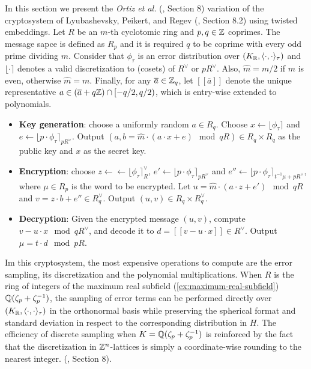 \documentclass[Ingles]{ic-tese-v3}
\begin{document}
\begin{text}
  In this section we present the \textit{Ortiz et al.} (\cite{Ortiz2021}, Section 8)
  variation of the cryptosystem of Lyubashevsky, Peikert, and Regev
  (\cite{LPV2013}, Section 8.2) using twisted embeddings. Let $R$ be an $m$-th
  cyclotomic ring and $p, q \in \mathbb{Z}$ coprimes. The message sapce is defined as
  $R_p$ and it is required $q$ to be coprime with every odd prime dividing
  $m$. Consider that $\phi_\tau$ is an error distribution over $(K_{\mathbb{R}},\langle{\cdot,\cdot}\rangle_\tau)$
  and $\lfloor{\cdot}\rceil$ denotes a valid discretization to (cosets) of $R^\vee$ or $pR^\vee$.
  Also, $\hat{m} = m/2$ if $m$ is even, otherwise $\hat{m} = m$. Finally, for any
  $\overline{a} \in \mathbb{Z}_q$, let $[[\overline{a}]]$ denote the unique representative
  $a \in (\overline{a} + q\mathbb{Z}) \cap [-q/2, q/2)$, which is entry-wise extended to
  polynomials.

  \begin{itemize}
  \item \textbf{Key generation}: choose a uniformly random $a \in R_q$. Choose $x
    \longleftarrow \lfloor{\phi_\tau}\rceil$ and $e \longleftarrow \lfloor{p \cdot \phi_\tau}\rceil_{pR^\vee}$. Output $(a,b = \hat{m}\cdot(a \cdot x + e)
    \mod{qR} ) \in R_q \times R_q$ as the public key and $x$ as the secret key.
  \item \textbf{Encryption}: choose $z \longleftarrow \longleftarrow \lfloor{\phi_\tau}\rceil_R^\vee$, $e' \longleftarrow \lfloor{p \cdot
      \phi_\tau}\rceil_{pR^\vee}$ and  $e'' \longleftarrow \lfloor{p \cdot \phi_\tau}\rceil_{t^{-1}\mu +pR^\vee}$, where $\mu \in R_p$ is
    the word to be encrypted. Let $u = \hat{m} \cdot (a \cdot z + e') \mod{qR}$ and $v =
    z \cdot b + e'' \in R_q^\vee$. Output $(u,v) \in R_q \times R^\vee_q$.
  \item \textbf{Decryption}: Given the encrypted message $(u,v)$, compute $v - u
    \cdot x \mod{qR^\vee}$, and decode it to $d = [[v - u \cdot x]] \in R^\vee$. Output $\mu = t \cdot
    d \mod{pR}$. 
  \end{itemize}

  Im this cryptosystem, the most expensive operations to compute are the error
  sampling, its discretization and the polynomial multiplications. When $R$ is
  the ring of integers of the maximum real subfield
  (\ref{ex:maximum-real-subfield}) $\mathbb{Q}(\zeta_p + \zeta_p^{-1})$, the sampling of error
  terms can be performed directly over $(K_{\mathbb{R}}, \langle{\cdot,\cdot}\rangle_\tau)$ in the orthonormal
  basis while preserving the spherical format and standard deviation in respect
  to the corresponding distribution in $H$. The efficiency
of discrete sampling when $K = \mathbb{Q}(\zeta_p + \zeta_p^{-1})$ is reinforced by the fact
that the discretization in $\mathbb{Z}^n$-lattices is simply a coordinate-wise rounding to the nearest integer. (\cite{Ortiz2021}, Section 8).
\end{text}
\end{document}

